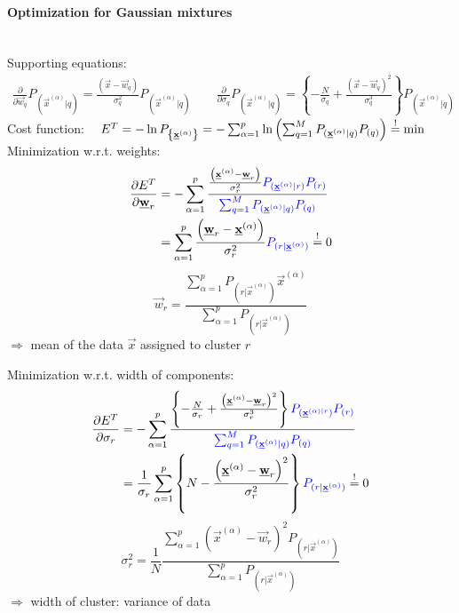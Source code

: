 \paragraph{Optimization for Gaussian mixtures}\mbox{}\\
\vspace{-0.3cm}
\small
Supporting equations:
\smaller
\begin{align*}
\frac{\partial}{\partial \vec{w}_q} P_{(\vec{x}^{(\alpha)} | q)} = \frac{\left( \vec{x} - \vec{w}_q \right)}{\sigma_q^2} P_{(\vec{x}^{(\alpha)} | q)} \qquad
\frac{\partial}{\partial \sigma_q} P_{(\vec{x}^{(\alpha)} | q)} = \left\{ -\frac{N}{\sigma_q} + \frac{\left( \vec{x} - \vec{w}_q \right)^2}{\sigma_q^3} \right\} P_{(\vec{x}^{(\alpha)} | q)}
\end{align*}
\small
Cost function:
$\quad
E^T = - \ln P_{\left\{ \underline{\mathbf{x}}^{(\alpha)} \right\}} = - \sum_{\alpha=1}^{p} \ln \left( \sum_{q=1}^{M} P_{(\underline{\mathbf{x}}^{(\alpha)} | q)} P_{(q)} \right) \stackrel{\mathrm{!}}{=} \min
$\\\vspace{0.2cm}
Minimization w.r.t. weights:
\begin{align*}
\frac{\partial E^T}{\partial \underline{\mathbf{w}}_r} &= - \sum_{\alpha = 1}^{p} \frac{\frac{\left( \underline{\mathbf{x}}^{(\alpha)} - \underline{\mathbf{w}}_r \right)}{\sigma_r^2} \color{blue}{P_{(\ensuremath{\underline{\mathbf{x}}}^{(\alpha)} | r)} P_{(r)}}}{\color{blue}{ \sum_{q=1}^{M} P_{(\ensuremath{\underline{\mathbf{x}}}^{(\alpha)} | q)} P_{(q)}}} \\
&= \sum_{\alpha=1}^{p} \frac{\left( \underline{\mathbf{w}}_r - \underline{\mathbf{x}}^{(\alpha)} \right)}{\sigma_r^2} \color{blue}{P_{(r | \ensuremath{\underline{\mathbf{x}}}^{(\alpha)})}} \color{black} \stackrel{\mathrm{!}}{=} 0
\end{align*}
\begin{equation*}
\boxed{\vec{w}_r = \frac{\sum_{\alpha=1}^{p} P_{(r | \vec{x}^{(\alpha)})} \vec{x}^{(\alpha)}}{\sum_{\alpha = 1}^{p} P_{(r | \vec{x}^{(\alpha)})}}}
\end{equation*}
$\Rightarrow$ mean of the data $\vec{x}$ assigned to cluster $r$

Minimization w.r.t. width of components:
\begin{align*}
\frac{\partial E^T}{\partial \sigma_r} &= - \sum_{\alpha=1}^{p} \frac{\left\{ - \frac{N}{\sigma_r} + \frac{\left( \underline{\mathbf{x}}^{(\alpha)} - \underline{\mathbf{w}}_r\right)^2}{\sigma_r^3} \right\} \color{blue}{P_{(\ensuremath{\underline{\mathbf{x}}}^{(\alpha) | r})}P_{(r)}}}{\color{blue}{\sum_{q=1}^{M} P_{(\ensuremath{\underline{\mathbf{x}}}^{(\alpha)} | q)} P_{(q)}}} \\
&= \frac{1}{\sigma_r} \sum_{\alpha=1}^{p} \left\{ N - \frac{\left( \underline{\mathbf{x}}^{(\alpha)} - \underline{\mathbf{w}}_r \right)^2}{\sigma_r^2} \right\} \color{blue}{P_{(r | \ensuremath{\underline{\mathbf{x}}}^{(\alpha)})}} \color{black} \stackrel{\mathrm{!}}{=} 0
\end{align*}
\vspace{-0.2cm}
\begin{equation*}
\boxed{\sigma_r^2 = \frac{1}{N} \frac{\sum_{\alpha=1}^{p} \left( \vec{x}^{(\alpha)} - \vec{w}_r \right)^2 P_{(r | \vec{x}^{(\alpha)})}}{\sum_{\alpha = 1}^{p} P_{(r | \vec{x}^{(\alpha)})}}}
\end{equation*}
$\Rightarrow$ width of cluster: variance of data

